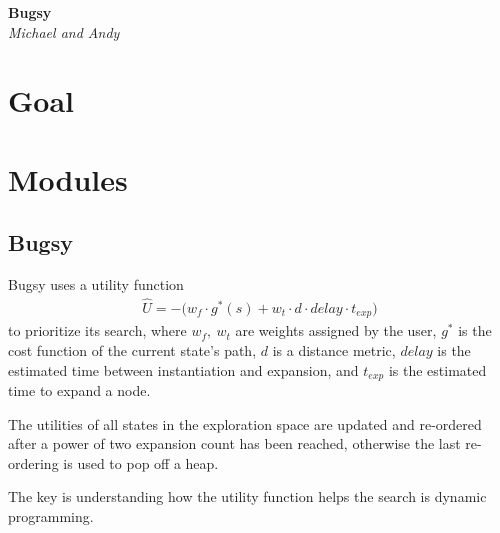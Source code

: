 \documentclass[a4paper]{article}
\begin{document}
\onehalfspacing
\begin{center}
\textbf{Bugsy}\\
\textit{Michael and Andy}\\
\end{center}
\vspace{0.15in}

\section{Goal}
\section{Modules}
\subsection*{Bugsy}

Bugsy uses a utility function \begin{align*}
\hat{U} = -\big( w_f \cdot g^* (s) + w_t \cdot d \cdot delay \cdot t_{exp} \big)
\end{align*}
to prioritize its search, where $w_f, \ w_t$ are weights assigned by the user, $g^*$ is the cost function of the current state's path, $d$ is a distance metric, $delay$ is the estimated time between instantiation and expansion, and $t_{exp}$ is the estimated time to expand a node.

The utilities of all states in the exploration space are updated and re-ordered after a power of two expansion count has been reached, otherwise the last re-ordering is used to pop off a heap.

The key is understanding how the utility function helps the search is dynamic programming.
\end{document}
